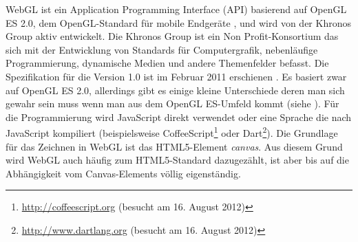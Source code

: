 WebGL ist ein Application Programming Interface (API) basierend auf OpenGL ES 2.0, dem OpenGL-Standard für mobile Endgeräte \autocite{OpenGlES}, und wird von der Khronos Group aktiv entwickelt. Die Khronos Group ist ein Non Profit-Konsortium das sich mit der Entwicklung von Standards für Computergrafik, nebenläufige Programmierung, dynamische Medien und andere Themenfelder befasst. Die Spezifikation für die Version 1.0 ist im Februar 2011 erschienen \autocite{WebGLSpec}. Es basiert zwar auf OpenGL ES 2.0, allerdings gibt es einige kleine Unterschiede deren man sich gewahr sein muss wenn man aus dem OpenGL ES-Umfeld kommt (siehe \autocite{WebGLDiff}). Für die Programmierung wird JavaScript direkt verwendet oder eine Sprache die nach JavaScript kompiliert (beispielsweise CoffeeScript\footnote{\url{http://coffeescript.org} (besucht am 16. August 2012)} oder Dart\footnote{\url{http://www.dartlang.org} (besucht am 16. August 2012)}). Die Grundlage für das Zeichnen in WebGL ist das HTML5-Element \textit{canvas}. Aus diesem Grund wird WebGL auch häufig zum HTML5-Standard dazugezählt, ist aber bis auf die Abhängigkeit vom Canvas-Elements völlig eigenständig.

